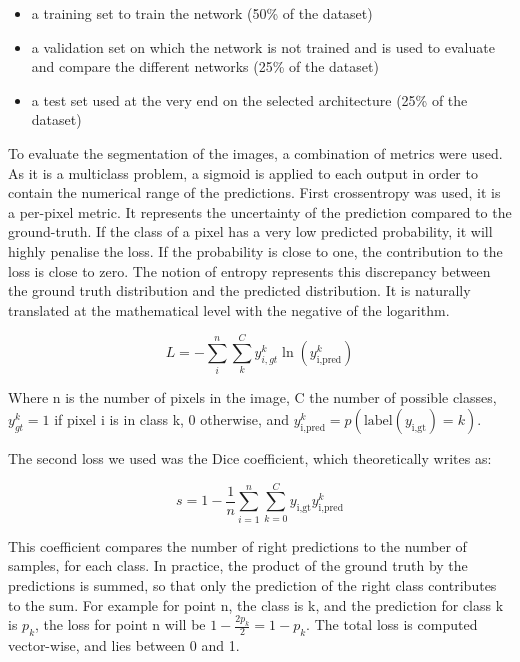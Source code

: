 \begin{itemize}
    \item a training set to train the network (50\% of the dataset)
    \item a validation set on which the network is not trained and
    is used to evaluate and compare the different networks (25\%
    of the dataset) \item a test set used at the very end on the
    selected architecture (25\% of the dataset)
\end{itemize}


To evaluate the segmentation of the images, a combination of
metrics were used. As it is a multiclass problem, a sigmoid is
applied to each output in order to contain the numerical range of
the predictions. First crossentropy was used, it is a per-pixel
metric. It represents the uncertainty of the prediction compared to
the ground-truth. If the class of a pixel has a very low predicted
probability, it will highly penalise the loss. If the probability
is close to one, the contribution to the loss is close to zero. The
notion of entropy represents this discrepancy between the ground truth
distribution and the predicted distribution. It is naturally translated
at the mathematical level with the negative of the logarithm.

\begin{equation}
    L =-\sum_i^n\sum_k^C{y^k_{i, gt}\ln(y_{\textrm{i},
    \textrm{pred}}^k)}
\end{equation}

Where n is the number of pixels in the image, C the number of possible
classes, $y_{gt}^k = 1$ if pixel i is in class k, 0 otherwise, and
$y_ {\textrm{i}, \textrm{pred}}^k = p(\textrm{label}(y_{\textrm{i},
\textrm{gt}}) = k)$.

The second loss we used was the Dice coefficient, which theoretically
writes as:

\begin{equation}
    s = 1 - \frac{1}{n}\sum_{i=1}^n\sum_{k=0}^{C}y_{\textrm{i},
    \textrm{gt}} y_{\textrm{i}, \textrm{pred}}^k
\end{equation}


This coefficient compares the number of right predictions to the
number of samples, for each class. In practice, the product of the
ground truth by the predictions is summed, so that only the prediction
of the right class contributes to the sum. For example for point n,
the class is k, and the prediction for class k is $p_k$, the loss
for point n will be $1 - \frac{2p_k}{2} = 1 - p_k$. The total loss
is computed vector-wise, and lies between 0 and 1.


